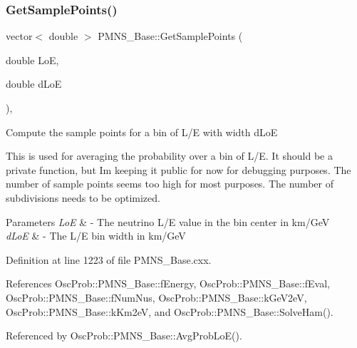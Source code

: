 \subsubsection{\texorpdfstring{Get\+Sample\+Points()}{GetSamplePoints()}}
{\footnotesize\ttfamily vector$<$ double $>$ P\+M\+N\+S\+\_\+\+Base\+::\+Get\+Sample\+Points (\begin{DoxyParamCaption}\item[{double}]{LoE,  }\item[{double}]{d\+LoE }\end{DoxyParamCaption})\hspace{0.3cm}{\ttfamily [virtual]}, {\ttfamily [inherited]}}

Compute the sample points for a bin of L/E with width d\+LoE

This is used for averaging the probability over a bin of L/E. It should be a private function, but I\textquotesingle{}m keeping it public for now for debugging purposes. The number of sample points seems too high for most purposes. The number of subdivisions needs to be optimized.


\begin{DoxyParams}{Parameters}
{\em LoE} & -\/ The neutrino L/E value in the bin center in km/\+GeV \\
\hline
{\em d\+LoE} & -\/ The L/E bin width in km/\+GeV \\
\hline
\end{DoxyParams}


Definition at line 1223 of file P\+M\+N\+S\+\_\+\+Base.\+cxx.



References Osc\+Prob\+::\+P\+M\+N\+S\+\_\+\+Base\+::f\+Energy, Osc\+Prob\+::\+P\+M\+N\+S\+\_\+\+Base\+::f\+Eval, Osc\+Prob\+::\+P\+M\+N\+S\+\_\+\+Base\+::f\+Num\+Nus, Osc\+Prob\+::\+P\+M\+N\+S\+\_\+\+Base\+::k\+Ge\+V2eV, Osc\+Prob\+::\+P\+M\+N\+S\+\_\+\+Base\+::k\+Km2eV, and Osc\+Prob\+::\+P\+M\+N\+S\+\_\+\+Base\+::\+Solve\+Ham().



Referenced by Osc\+Prob\+::\+P\+M\+N\+S\+\_\+\+Base\+::\+Avg\+Prob\+Lo\+E().


